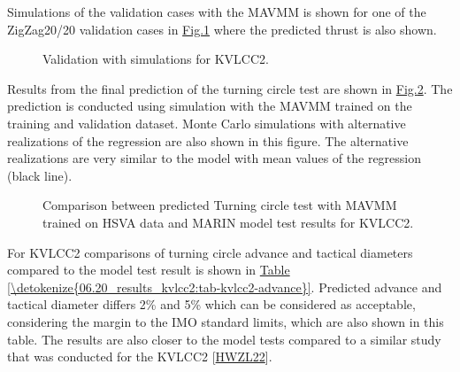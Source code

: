\documentclass[review]{elsarticle}
\begin{document}
Simulations of the validation cases with the MAVMM is shown for one of the ZigZag20/20 validation cases in \hyperref[\detokenize{06.20_results_kvlcc2:fig-kvlcc2-validation-sim}]{Fig.\@ \ref{\detokenize{06.20_results_kvlcc2:fig-kvlcc2-validation-sim}}} where the predicted thrust is also shown.

\begin{figure}[H]
\centering
\capstart

\noindent{}
\caption{Validation with simulations for KVLCC2.}\label{\detokenize{06.20_results_kvlcc2:fig-kvlcc2-validation-sim}}\end{figure}

\sphinxAtStartPar
Results from the final prediction of the turning circle test are shown in \hyperref[\detokenize{06.20_results_kvlcc2:fig-kvlcc2-testing-sim}]{Fig.\@ \ref{\detokenize{06.20_results_kvlcc2:fig-kvlcc2-testing-sim}}}. The prediction is conducted using simulation with the MAVMM trained on the training and validation dataset. Monte Carlo simulations with alternative realizations of the regression are also shown in this figure. The alternative realizations are very similar to the model with mean values of the regression (black line).

\begin{figure}[H]
\centering
\capstart

\noindent{}
\caption{Comparison between predicted Turning circle test with MAVMM trained on HSVA data and MARIN model test results for KVLCC2.}\label{\detokenize{06.20_results_kvlcc2:fig-kvlcc2-testing-sim}}\end{figure}

\sphinxAtStartPar
For KVLCC2 comparisons of turning circle advance and tactical diameters compared to the model test result is shown in \hyperref[\detokenize{06.20_results_kvlcc2:tab-kvlcc2-advance}]{Table \ref{\detokenize{06.20_results_kvlcc2:tab-kvlcc2-advance}}}. Predicted advance and tactical diameter differs 2\% and 5\% which can be considered as acceptable, considering the margin to the IMO standard limits, which are also shown in this table. The results are also closer to the model tests compared to a similar study that was conducted for the KVLCC2 {[}\hyperlink{cite.bibligraphy:id82}{HWZL22}{]}.
\end{document}
